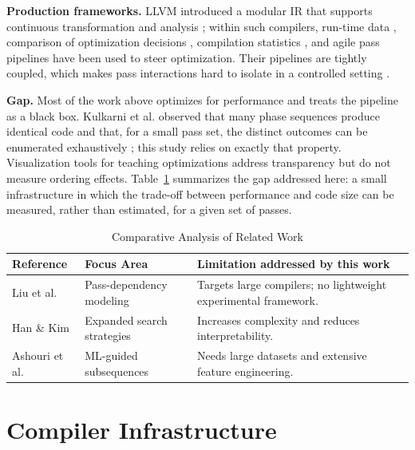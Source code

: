 \documentclass[conference,a4paper]{IEEEtran}
\begin{document}
\textbf{Production frameworks.} LLVM introduced a modular IR that supports continuous transformation and analysis \cite{ref16}; within such compilers, run-time data \cite{ref23}, comparison of optimization decisions \cite{ref24}, compilation statistics \cite{ref7}, and agile pass pipelines \cite{ref27} have been used to steer optimization. Their pipelines are tightly coupled, which makes pass interactions hard to isolate in a controlled setting \cite{ref16}.

\textbf{Gap.} Most of the work above optimizes for performance and treats the pipeline as a black box. Kulkarni et al. observed that many phase sequences produce identical code and that, for a small pass set, the distinct outcomes can be enumerated exhaustively \cite{ref19}; this study relies on exactly that property. Visualization tools for teaching optimizations \cite{ref30} address transparency but do not measure ordering effects. Table~\ref{tab:lit_review} summarizes the gap addressed here: a small infrastructure in which the trade-off between performance and code size can be measured, rather than estimated, for a given set of passes.

\begin{table}[htbp]
\caption{Comparative Analysis of Related Work}
\label{tab:lit_review}
\centering
\renewcommand{\arraystretch}{1.1}
{\small
\begin{tabularx}{\columnwidth}{@{}p{} p{} X@{}}
\toprule
\textbf{Reference} & \textbf{Focus Area} & \textbf{Limitation addressed by this work} \\
\midrule
Liu et al. \cite{ref1} & Pass-dependency modeling & Targets large compilers; no lightweight experimental framework. \\
Han \& Kim \cite{ref2} & Expanded search strategies & Increases complexity and reduces interpretability. \\
Ashouri et al. \cite{ref15} & ML-guided subsequences & Needs large datasets and extensive feature engineering. \\
\bottomrule
\end{tabularx}
}
\end{table}

\section{Compiler Infrastructure}
\end{document}
